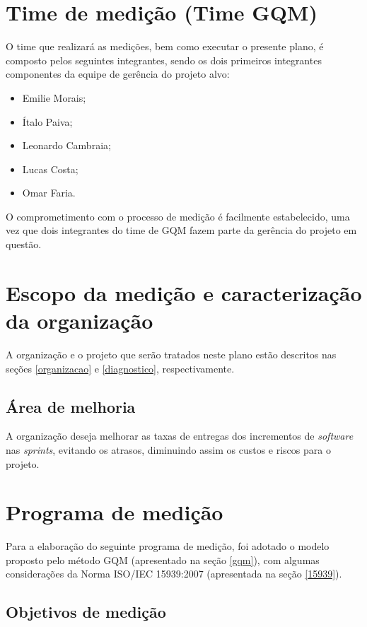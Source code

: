 \section{Time de medição (Time GQM)}

	O time que realizará as medições, bem como executar o presente plano, é composto pelos seguintes integrantes,
	sendo os dois primeiros integrantes componentes da equipe de gerência do projeto alvo:

	\begin{itemize}
	 \item Emilie Morais;
	 \item Ítalo Paiva;
	 \item Leonardo Cambraia;
	 \item Lucas Costa;
	 \item Omar Faria.
	\end{itemize}

	O comprometimento com o processo de medição é facilmente estabelecido, uma vez que dois integrantes do time de GQM
	fazem parte da gerência do projeto em questão.

    \section{Escopo da medição e caracterização da organização}

      A organização e o projeto que serão tratados neste plano estão descritos nas seções
      \ref{organizacao} e \ref{diagnostico}, respectivamente.

      \subsection{Área de melhoria}

	A organização deseja melhorar as taxas de entregas dos incrementos de \textit{software} nas \textit{sprints}, evitando os
	atrasos, diminuindo assim os custos e riscos para o projeto.


    \section{Programa de medição}

      Para a elaboração do seguinte programa de medição, foi adotado o modelo proposto pelo método GQM (apresentado na seção \ref{gqm}),
      com algumas considerações da Norma ISO/IEC 15939:2007 (apresentada na seção \ref{15939}).

      \subsection{Objetivos de medição}


